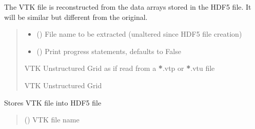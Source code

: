 \documentclass[letterpaper,10pt,english]{sphinxmanual}
\begin{document}
\begin{fulllineitems}
\begin{fulllineitems}
\sphinxAtStartPar
The VTK file is reconstructed from the data arrays stored in the HDF5 file. It will be similar but different from the original.
\begin{quote}\begin{description}
\begin{itemize}
\item {} 
\sphinxAtStartPar
{} () \textendash{} File name to be extracted (unaltered since HDF5 file creation)

\item {} 
\sphinxAtStartPar
{} (\sphinxstyleliteralemphasis{\sphinxupquote{, }}) \textendash{} Print progress statements, defaults to False

\end{itemize}

\sphinxAtStartPar
VTK Unstructured Grid as if read from a {\color{red}\bfseries{}*}.vtp or {\color{red}\bfseries{}*}.vtu file

\sphinxAtStartPar
VTK Unstructured Grid

\end{description}\end{quote}

\end{fulllineitems}


\begin{fulllineitems}
\label{\detokenize{pyfdempp:pyfdempp.aggregate_storage.aggregate_storage.store_file}}
\pysigstartsignatures
{}
\pysigstopsignatures
\sphinxAtStartPar
Stores VTK file into HDF5 file
\begin{quote}\begin{description}
\sphinxAtStartPar
{} () \textendash{} VTK file name

\end{description}\end{quote}

\end{fulllineitems}


\end{fulllineitems}
\end{document}
